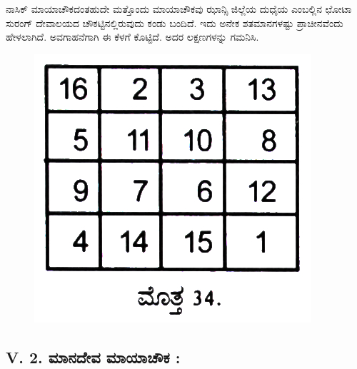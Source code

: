 ನಾಸಿಕ್ ಮಾಯಾಚೌಕದಂತಹುದೇ ಮತ್ತೊಂದು ಮಾಯಾಚೌಕವು ಝಾನ್ಸಿ ಜಿಲ್ಲೆಯ ದುಧೈಯ ಎಂಬಲ್ಲಿನ ಛೋಟಾ ಸುರಂಗ್ ದೇವಾಲಯದ ಚೌಕಟ್ಟಿನಲ್ಲಿರುವುದು ಕಂಡು ಬಂದಿದೆ. ಇದು ಅನೇಕ ಶತಮಾನಗಳಷ್ಟು ಪ್ರಾಚೀನವೆಂದು ಹೇಳಲಾಗಿದೆ. ಅವಗಾಹನೆಗಾಗಿ ಈ ಕೆಳಗೆ ಕೊಟ್ಟಿದೆ. ಅದರ ಲಕ್ಷಣಗಳನ್ನು ಗಮನಿಸಿ.
\begin{figure}[H]
\includegraphics{src/figures/chap4/fig4-7.jpg}
\end{figure}

\subsection*{V. 2. ಮಾನದೇವ ಮಾಯಾಚೌಕ :}

